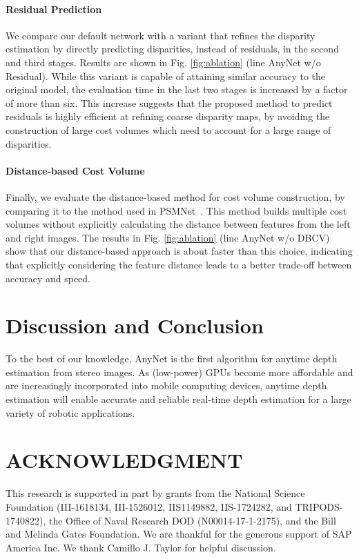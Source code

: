 \documentclass[letterpaper, 10 pt, conference]{ieeeconf}
\newcommand{\nameshort}[1]{AnyNet}
\begin{document}
\paragraph{\textbf{Residual Prediction}}
We compare our default network with a variant that refines the disparity estimation by directly predicting disparities, instead of residuals, in the second and third stages. Results are shown in Fig. \ref{fig:ablation} (line \nameshort{} w/o Residual). While this variant is capable of attaining similar accuracy to the original model, the evaluation time in the last two stages is increased by a factor of more than six. This increase suggests that the proposed method to predict residuals is highly efficient at refining coarse disparity maps, by avoiding the construction of large cost volumes which need to account for a large range of disparities.

\paragraph{\textbf{Distance-based Cost Volume}}
Finally, we evaluate the distance-based method for cost volume construction, by comparing it to the method used in PSMNet~\cite{zhao2017pyramid}. This method builds multiple cost volumes without explicitly calculating the distance between features from the left and right images.  The results in Fig. \ref{fig:ablation} (line \nameshort{} w/o DBCV) show that our distance-based approach is about  faster than this choice, indicating that explicitly considering the feature distance leads to a better trade-off between accuracy and speed.




 	

\section{Discussion and Conclusion}
  
To the best of our knowledge, \nameshort{} is the first algorithm for anytime depth estimation from stereo images. As (low-power) GPUs become more affordable and are increasingly incorporated into mobile computing devices, anytime depth estimation will enable accurate and reliable real-time depth estimation for a large variety of robotic applications. 
%
 

	
	


	
	




 \section*{ACKNOWLEDGMENT}
 This research is supported in part by grants from the National Science Foundation (III-1618134, III-1526012, IIS1149882, IIS-1724282, and TRIPODS-1740822), the Office of Naval Research DOD (N00014-17-1-2175), and the
 Bill and Melinda Gates Foundation. We are thankful for the
 generous support of SAP America Inc. We thank Camillo J. Taylor for helpful discussion.


	 
	 
\end{document}
